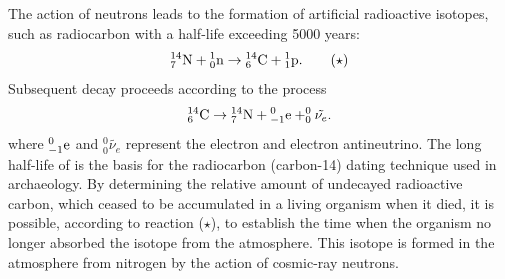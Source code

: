 \subsection{}\label{42.9.7} The action of neutrons  leads to the formation of artificial radioactive isotopes, such as radiocarbon   with a half-life  exceeding 5000 years:
\begin{equation*}%
\nuc{N}{14}{7} + \nuc{n}{1}{0} \to \nuc{C}{14}{6} + \nuc{p}{1}{1}.\tag{$\star$}
\end{equation*}
Subsequent decay proceeds according to the process
\begin{equation*}%
\nuc{C}{14}{6} \to  \nuc{N}{14}{7} + \nuc{e}{0}{-1} + ^{0}_{0}\tilde{\nu_{e}}.
\end{equation*}
where $\nuc{e}{0}{-1}$ and $^{0}_{0}\tilde{\nu_{e}}$ represent the electron and electron antineutrino. The long half-life of  is the basis for the radiocarbon (carbon-14) dating technique used in archaeology. By determining the relative amount of undecayed radioactive carbon, which ceased to be accumulated in a living organism when it died, it is possible, according to reaction ($\star$), to establish the time when the organism no longer absorbed the isotope  from
the atmosphere. This isotope is formed in the atmosphere from nitrogen by the action of cosmic-ray neutrons.

